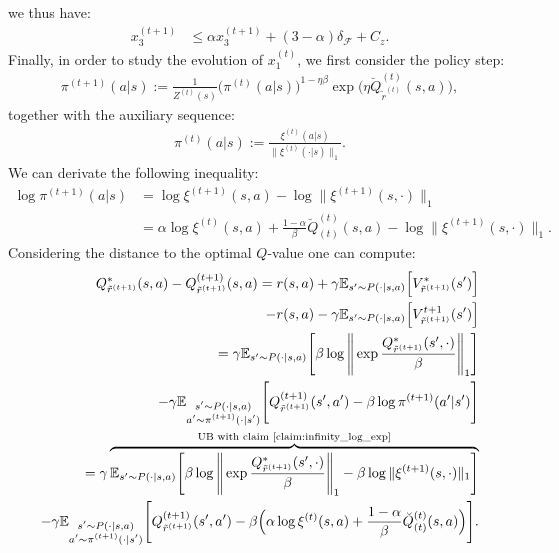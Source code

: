 we thus have:
\begin{equation}
    \label{eq:ineq_min}
    \begin{aligned}
        x_3^{(t+1)} &\leq
        \alpha x_3^{(t+1)}
        + (3-\alpha) \delta_\mathcal{F} + C_z.
    \end{aligned}
\end{equation}
Finally, in order to study the evolution of $x_1^{(t)}$, we first consider the policy step:
\begin{align}
    \pi^{(t+1)}(a|s) := 
    \frac{1}{Z^{(t)}(s)}
    \bigl(\pi^{(t)}(a|s)\bigr)^{1-\eta \beta}
    \exp\bigl(
        \eta \breve{{Q}}_{\tilde{r}^{(t)}}^{(t)}(s,a)
    \bigr),
\end{align}
together with the auxiliary sequence:
\begin{align}
    \pi^{(t)}(a|s) := \frac{\xi^{(t)} (a|s) }{\| \xi^{(t)}(\cdot|s) \|_1}.
\end{align}
We can derivate the following inequality:
\begin{align}
    \log \pi^{(t+1)}(a|s) 
    &= \log \xi^{(t+1)}(s,a) - \log \| \xi^{(t+1)}(s,\cdot)\|_1\\
    &= \alpha \log \xi^{(t)}(s,a) 
    + \frac{1-\alpha}{\beta}\breve{Q}^{(t)}_{(t)}(s,a)  
    - \log \| \xi^{(t+1)}(s,\cdot)\|_1.
\end{align}
Considering the distance to the optimal $Q$-value one can compute:
\begin{align*}
    Q^*_{\tilde{r}^{(t+1)}}(s,a)
    -Q^{(t+1)}_{\tilde{r}^{(t+1)}}(s,a) = 
    r(s,a) + \gamma \mathbb{E}_{s'\sim P(\cdot|s,a)} \Big[ V^*_{\tilde{r}^{(t+1)}}(s')  \Big] \\
    - r(s,a) - \gamma \mathbb{E}_{s'\sim P(\cdot|s,a)} \Big[ V^{t+1}_{\tilde{r}^{(t+1)}}(s')  \Big] 
    \\
    =
    \gamma \mathbb{E}_{s'\sim P(\cdot|s,a)} \Bigg[ 
            \beta \log \Bigg\| \exp \frac{ Q^{*}_{\tilde{r}^{(t+1)}}(s',\cdot) }{\beta} \Bigg\|_1
        \Bigg] \\
    - \gamma \mathbb{E}_{\substack{s'\sim P(\cdot|s,a)\\a' \sim \pi^{(t+1)}(\cdot|s')}} \Bigg[ 
            Q^{(t+1)}_{\tilde{r}^{(t+1)}}(s',a') - \beta \log \pi^{(t+1)}(a'|s')
        \Bigg] 
    \\
    =
    \gamma \overbrace{\mathbb{E}_{s'\sim P(\cdot|s,a)} \Bigg[ 
            \beta \log \Bigg\| \exp \frac{ Q^{*}_{\tilde{r}^{(t+1)}}(s',\cdot) }{\beta} \Bigg\|_1
            - \beta \log \| \xi^{(t+1)}(s,\cdot)\|_1
        \Bigg] }^\text{UB with claim \ref{claim:infinity_log_exp}}\\
    - \gamma \mathbb{E}_{\substack{s'\sim P(\cdot|s,a)\\a' \sim \pi^{(t+1)}(\cdot|s')}} \Bigg[ 
            Q^{(t+1)}_{\tilde{r}^{(t+1)}}(s',a') - \beta 
            \Bigl(
                \alpha \log \xi^{(t)}(s,a) 
                + \frac{1-\alpha}{\beta}\breve{Q}^{(t)}_{(t)}(s,a)  
            \Bigr)    
        \Bigg].
    \end{align*}
